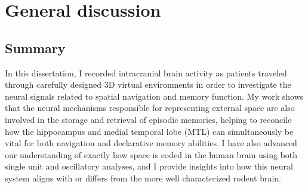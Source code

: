 \chapter{General discussion}
\large

\section{Summary}

In this dissertation, I recorded intracranial brain activity as patients traveled through carefully designed 3D virtual environments in order to investigate the neural signals related to spatial navigation and memory function. My work shows that the neural mechanisms responsible for representing external space are also involved in the storage and retrieval of episodic memories, helping to reconcile how the hippocampus and medial temporal lobe (MTL) can simultaneously be vital for both navigation and declarative memory abilities. I have also advanced our understanding of exactly how space is coded in the human brain using both single unit and oscillatory analyses, and I provide insights into how this neural system aligns with or differs from the more well characterized rodent brain. 

